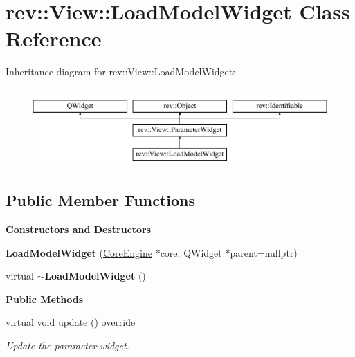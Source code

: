 \hypertarget{classrev_1_1_view_1_1_load_model_widget}{}\section{rev\+::View\+::Load\+Model\+Widget Class Reference}
\label{classrev_1_1_view_1_1_load_model_widget}
Inheritance diagram for rev\+::View\+::Load\+Model\+Widget\+:\begin{figure}[H]
\begin{center}
\leavevmode
\includegraphics[height=3.000000cm]{classrev_1_1_view_1_1_load_model_widget}
\end{center}
\end{figure}
\subsection*{Public Member Functions}
\begin{Indent}\textbf{ Constructors and Destructors}\par
\begin{DoxyCompactItemize}
\item 
\mbox{\label{classrev_1_1_view_1_1_load_model_widget_a4587e503222b297164768e084306db72}} 
{\bfseries Load\+Model\+Widget} (\mbox{\hyperlink{classrev_1_1_core_engine}{Core\+Engine}} $\ast$core, Q\+Widget $\ast$parent=nullptr)
\item 
\mbox{\label{classrev_1_1_view_1_1_load_model_widget_a6c0b5c0b6c94ae281e6fe0b15f4c6b79}} 
virtual {\bfseries $\sim$\+Load\+Model\+Widget} ()
\end{DoxyCompactItemize}
\end{Indent}
\begin{Indent}\textbf{ Public Methods}\par
\begin{DoxyCompactItemize}
\item 
\mbox{\label{classrev_1_1_view_1_1_load_model_widget_a6420391db9eae6ff1c85a295a0f618de}} 
virtual void \mbox{\hyperlink{classrev_1_1_view_1_1_load_model_widget_a6420391db9eae6ff1c85a295a0f618de}{update}} () override
\begin{DoxyCompactList}\small\item\em Update the parameter widget. \end{DoxyCompactList}\end{DoxyCompactItemize}
\end{Indent}
